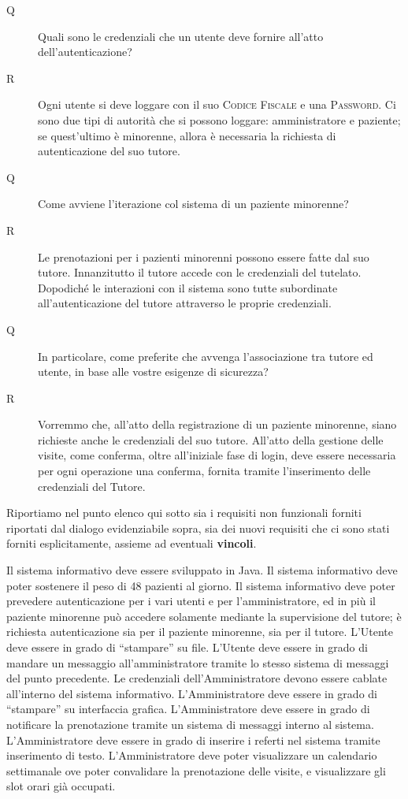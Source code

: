 \begin{description}
\item[Q] Quali sono le credenziali che un utente deve fornire all'atto dell'autenticazione?
\item[R] Ogni utente si deve loggare con il suo \textsc{Codice Fiscale} e una \textsc{Password}. 
	Ci sono due tipi di autorità che si possono loggare: amministratore e paziente;
	se quest'ultimo è minorenne, allora è necessaria la richiesta di autenticazione
	del suo tutore.
\medskip

\item[Q] Come avviene l'iterazione col sistema di un paziente minorenne?
\item[R] Le prenotazioni per i pazienti minorenni possono essere fatte dal suo tutore.
Innanzitutto il tutore accede con le credenziali del tutelato. Dopodiché le interazioni con il sistema sono tutte subordinate all'autenticazione del tutore attraverso le proprie credenziali.

\item[Q] In particolare, come preferite che avvenga l'associazione tra tutore ed utente, in base
	alle vostre esigenze di sicurezza?
\item[R] Vorremmo che, all'atto della registrazione di un paziente minorenne, 	
	siano richieste anche le credenziali del suo tutore. All'atto della
	gestione delle visite, come conferma, oltre all'iniziale fase di login,
	deve essere necessaria per ogni operazione una conferma, fornita
	tramite l'inserimento delle credenziali del Tutore.
\end{description}

Riportiamo nel punto elenco qui sotto sia i requisiti non funzionali forniti
riportati dal dialogo evidenziabile sopra, sia dei nuovi requisiti che ci sono
stati forniti esplicitamente, assieme ad eventuali \textbf{vincoli}.


\begin{itemize}
\diam Il sistema informativo deve essere sviluppato in Java.
\diam Il sistema informativo deve poter sostenere il peso di 48 pazienti al giorno.
\diam Il sistema informativo deve poter prevedere autenticazione per i vari
	utenti e per l'amministratore, ed in più il paziente minorenne può accedere solamente mediante
	la supervisione del tutore; è richiesta autenticazione  sia per il
	paziente minorenne, sia per il tutore.
\diam L'Utente deve essere in grado di ``stampare'' su file.
\diam L'Utente deve essere in grado di mandare un messaggio all'amministratore
	tramite lo stesso sistema di messaggi del punto precedente.
\diam Le credenziali dell'Amministratore devono essere cablate all'interno del
	sistema informativo.
\diam L'Amministratore deve essere in grado di ``stampare'' su interfaccia grafica.
\diam L'Amministratore deve essere in grado di notificare la prenotazione tramite
	un sistema di messaggi interno al sistema.
\diam L'Amministratore deve essere in grado di inserire i referti nel sistema
	tramite inserimento di testo.
\diam L'Amministratore deve poter visualizzare un calendario settimanale ove
	poter convalidare la prenotazione delle visite, e visualizzare gli slot
	orari già occupati.
\end{itemize}

